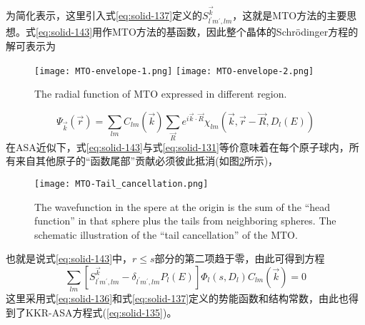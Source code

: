 为简化表示，这里引入式\eqref{eq:solid-137}定义的$S_{l^{\prime}m^{\prime},lm}^{\vec k}$，这就是MTO方法的主要思想。式\eqref{eq:solid-143}用作MTO方法的基函数，因此整个晶体的Schr\"odinger方程的解可表示为
\begin{figure}[h!]
\centering
\texttt{[image: MTO-envelope-1.png]}
\texttt{[image: MTO-envelope-2.png]}
\caption{\small \textrm{The radial function of MTO expressed in different region.}}%
\label{MTO-envelope}
\end{figure}
$$\Psi_{\vec k}(\vec r)=\sum_{lm}C_{lm}(\vec k)\sum_{\vec R}e^{i\vec k\cdot\vec R}\chi_{lm}(\vec k,\vec r-\vec R,D_l(E))$$
在ASA近似下，式\eqref{eq:solid-143}与式\eqref{eq:solid-131}等价意味着在每个原子球内，所有来自其他原子的“函数尾部”贡献必须彼此抵消(如图\ref{MTO-tail-candellation}所示)，%
\begin{figure}[h!]
\centering
\texttt{[image: MTO-Tail\_cancellation.png]}
\caption{\small \textrm{The wavefunction in the spere at the origin is the sum of the ``head function'' in that sphere plus the tails from neighboring spheres. The schematic illustration of the ``tail cancellation'' of the MTO.}}%
\label{MTO-tail-candellation}
\end{figure}
也就是说式\eqref{eq:solid-143}中，$r\leqslant s$部分的第二项趋于零，由此可得到方程%
\begin{equation}
  \sum_{lm}[S_{l^{\prime}m^{\prime},lm}^{\vec k}-\delta_{l^{\prime}m^{\prime},lm}P_l(E)]\Phi_l(s,D_l)C_{lm}(\vec k)=0
  \label{eq:solid-144}
\end{equation}
这里采用式\eqref{eq:solid-136}和式\eqref{eq:solid-137}定义的势能函数和结构常数，由此也得到了KKR-ASA方程式(\eqref{eq:solid-135})。


